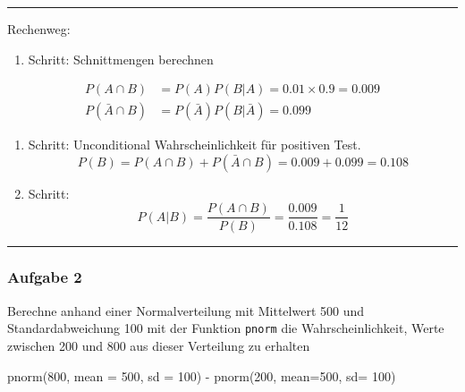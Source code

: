 \documentclass[
]{article}
\newenvironment{Shaded}{\begin{snugshade}}{\end{snugshade}}
\newcommand{\AttributeTok}[1]{\textcolor[rgb]{0.77,0.63,0.00}{#1}}
\newcommand{\DecValTok}[1]{\textcolor[rgb]{0.00,0.00,0.81}{#1}}
\newcommand{\FunctionTok}[1]{\textcolor[rgb]{0.00,0.00,0.00}{#1}}
\newcommand{\NormalTok}[1]{#1}
\newcommand{\SpecialCharTok}[1]{\textcolor[rgb]{0.00,0.00,0.00}{#1}}
\providecommand{\tightlist}{%
  \setlength{\itemsep}{0pt}\setlength{\parskip}{0pt}}
\begin{document}
\begin{center}\rule{0.5\linewidth}{0.5pt}\end{center}

Rechenweg:

\begin{enumerate}
\def\labelenumi{\arabic{enumi}.}
\tightlist
\item
  Schritt: Schnittmengen berechnen
\end{enumerate}

\begin{align}

  P(A \cap B)       &= P(A)P(B | A) = 0.01 \times 0.9 = 0.009 \\
  P(\bar A \cap B)  &= P(\bar A)P(B | \bar A) = 0.099

\end{align}

\begin{enumerate}
\def\labelenumi{\arabic{enumi}.}
\setcounter{enumi}{1}
\tightlist
\item
  Schritt: Unconditional Wahrscheinlichkeit für positiven Test. \[
    P(B)=P(A \cap B) + P(\bar A \cap B)= 0.009 + 0.099 = 0.108
  \]
\item
  Schritt: \[
    P(A | B) = \dfrac{P(A \cap B)}{P(B)} = \dfrac{0.009}{0.108} = \dfrac{1}{12}
  \]
\end{enumerate}

\begin{center}\rule{0.5\linewidth}{0.5pt}\end{center}

\hypertarget{aufgabe-2}{%
\subsubsection{Aufgabe 2}\label{aufgabe-2}}

Berechne anhand einer Normalverteilung mit Mittelwert 500 und
Standardabweichung 100 mit der Funktion \texttt{pnorm} die
Wahrscheinlichkeit, Werte zwischen 200 und 800 aus dieser Verteilung zu
erhalten

\begin{Shaded}
\begin{Highlighting}[]
\FunctionTok{pnorm}\NormalTok{(}\DecValTok{800}\NormalTok{, }\AttributeTok{mean =} \DecValTok{500}\NormalTok{, }\AttributeTok{sd =} \DecValTok{100}\NormalTok{) }\SpecialCharTok{{-}} \FunctionTok{pnorm}\NormalTok{(}\DecValTok{200}\NormalTok{, }\AttributeTok{mean=}\DecValTok{500}\NormalTok{, }\AttributeTok{sd=} \DecValTok{100}\NormalTok{)}
\end{Highlighting}
\end{Shaded}
\end{document}
